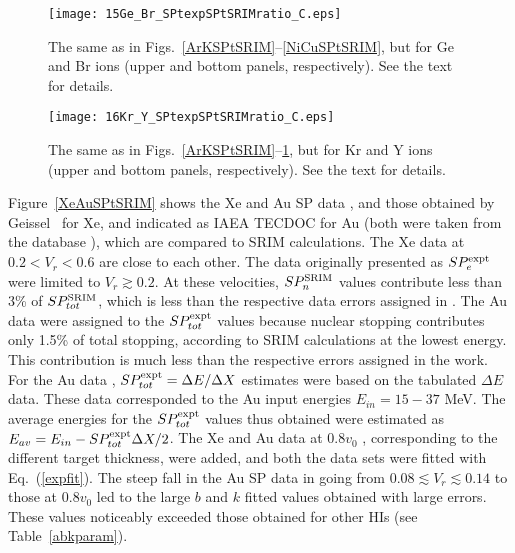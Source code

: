 \documentclass[aps,pra,twocolumn,amsmath,amssymb,floatfix]{revtex4-2}
\begin{document}
\begin{figure}[!h]   %
\begin{center}
\texttt{[image: 15Ge\_Br\_SPtexpSPtSRIMratio\_C.eps]}
\caption{\label{GeBrSPtSRIM} The same as in Figs.~\ref{ArKSPtSRIM}--\ref{NiCuSPtSRIM}, but for Ge and Br ions (upper and bottom panels, respectively). See the text for details.}
\end{center}
\end{figure}

\begin{figure}[!h]   %
\begin{center}
\texttt{[image: 16Kr\_Y\_SPtexpSPtSRIMratio\_C.eps]}
\caption{\label{KrYSPtSRIM} The same as in Figs.~\ref{ArKSPtSRIM}--\ref{GeBrSPtSRIM}, but for Kr and Y ions (upper and bottom panels, respectively). See the text for details.}
\end{center}
\end{figure}

Figure~\ref{XeAuSPtSRIM} shows the Xe and Au SP data \cite{Lennard86,Pape78,Abdess92,Trzaska18,Echler17,Jokinen97}, and those obtained by Geissel \ea\ for Xe, and indicated as IAEA TECDOC for Au (both were taken from the database \cite{IAEASP}), which are compared to SRIM calculations. The Xe data at $0.2 < V_{r} < 0.6$ are close to each other. The data \cite{Echler17} originally presented as $SP_{e}^{\rm expt}$ were limited to $V_{r} \gtrsim 0.2$. At these velocities, $SP_{n}^{\rm SRIM}$ values contribute less than 3\% of $SP_{tot}^{\rm SRIM}$, which is less than the respective data errors assigned in \cite{Echler17}. The Au data \cite{Abdess92} were assigned to the $SP_{tot}^{\rm expt}$ values because nuclear stopping contributes only 1.5\% of total stopping, according to SRIM calculations at the lowest energy. This contribution is much less than the respective errors assigned in the work. For the Au data \cite{Jokinen97}, $SP_{tot}^{\rm expt} = \Delta E/\Delta X$ estimates were based on the tabulated $\Delta E$ data. These data corresponded to the Au input energies $E_{in} = 15-37$ MeV. The average energies for the $SP_{tot}^{\rm expt}$ values thus obtained were estimated as $E_{av} = E_{in} - SP_{tot}^{\rm expt} \Delta X/2$. The Xe and Au data at $0.8 v_{0}$ \cite{Lennard86}, corresponding to the different target thickness, were added, and both the data sets were fitted with Eq.~(\ref{expfit}). The steep fall in the Au SP data in going from $0.08\lesssim V_{r} \lesssim 0.14$ \cite{Jokinen97} to those at $0.8 v_{0}$ \cite{Lennard86} led to the large $b$ and $k$ fitted values obtained with large errors. These values noticeably exceeded those obtained for other HIs (see Table~\ref{abkparam}).
\end{document}
